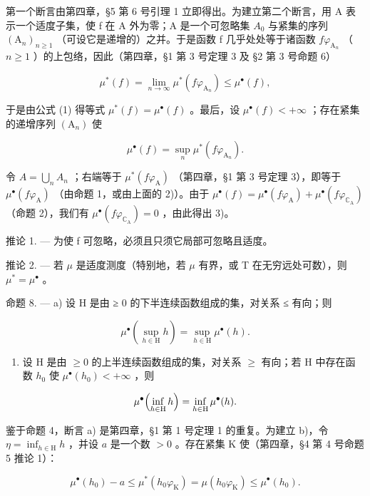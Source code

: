 第一个断言由第四章，§5 第 6 号引理 1 立即得出。为建立第二个断言，用 A 表示一个适度子集，使 f 在 A 外为零；A 是一个可忽略集 \(A_{0}\) 与紧集的序列 \((\mathrm{A}_{n})_{n\geqslant1}\) （可设它是递增的）之并。于是函数 f 几乎处处等于诸函数 \(f\varphi_{\mathrm{A}_{n}}\) （ \(n\geqslant1\) ）的上包络，因此（第四章，§1 第 3 号定理 3 及 §2 第 3 号命题 6）

\[
\mu^ {*} (f) = \lim _ {n \rightarrow \infty} \mu^ {*} (f \varphi_ {\mathrm{A} _ {n}}) \leqslant \mu^ {\bullet} (f),
\]

于是由公式 (1) 得等式 \(\mu^{*}(f)=\mu^{\bullet}(f)\) 。最后，设 \(\mu^{\bullet}(f)<+\infty\) ；存在紧集的递增序列 \((\mathrm{A}_{n})\) 使

\[
\mu^ {\bullet} (f) = \sup _ {n} \mu^ {*} (f \varphi_ {\mathrm{A} _ {n}}).
\]

令 \(A = \bigcup_{n} A_{n}\) ；右端等于 \(\mu^{*}(f\varphi_{\mathrm{A}})\) （第四章，§1 第 3 号定理 3），即等于 \(\mu^{\bullet}(f\varphi_{\mathrm{A}})\) （由命题 1，或由上面的 2)）。由于 \(\mu^{\bullet}(f) = \mu^{\bullet}(f\varphi_{\mathrm{A}}) + \mu^{\bullet}(f\varphi_{\mathbb{C}_{\mathrm{A}}})\) （命题 2），我们有 \(\mu^{\bullet}(f\varphi_{\mathbb{C}_{\mathrm{A}}}) = 0\) ，由此得出 3)。

推论 1. --- 为使 f 可忽略，必须且只须它局部可忽略且适度。

推论 2. --- 若 \(\mu\) 是适度测度（特别地，若 \(\mu\) 有界，或 T 在无穷远处可数），则 \(\mu^{*} = \mu^{\bullet}\) 。

命题 8. --- a) 设 H 是由 ≥ 0 的下半连续函数组成的集，对关系 ≤ 有向；则

\[
\mu^ {\bullet} \left(\sup _ {h \in \mathrm{H}} h\right) = \sup _ {h \in \mathrm{H}} \mu^ {\bullet} (h).
\]

\begin{enumerate}
\def\labelenumi{\alph{enumi})}
\setcounter{enumi}{1}
\tightlist
\item
  设 H 是由 \(\geqslant0\) 的上半连续函数组成的集，对关系 \(\geqslant\) 有向；若 H 中存在函数 \(h_{0}\) 使 \(\mu^{\bullet}(h_{0})<+\infty\) ，则
\end{enumerate}

\[
\mu^ {\bullet} \Bigl (\inf _ {h \in \mathrm{H}} h \Bigr) = \inf _ {h \in \mathrm{H}} \mu^ {\bullet} (h).
\]

鉴于命题 4，断言 a) 是第四章，§1 第 1 号定理 1 的重复。为建立 b)，令 \(\eta = \inf_{h\in \mathrm{H}}h\) ，并设 \(a\) 是一个数 \(>0\) 。存在紧集 K 使（第四章，§4 第 4 号命题 5 推论 1）：

\[
\mu^ {\bullet} (h _ {0}) - a \leqslant \mu^ {*} (h _ {0} \varphi_ {\mathrm{K}}) = \mu (h _ {0} \varphi_ {\mathrm{K}}) \leqslant \mu^ {\bullet} (h _ {0}).
\]

